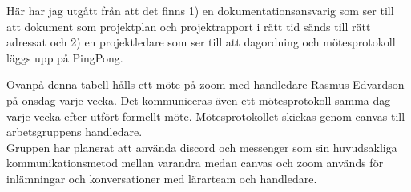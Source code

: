 \documentclass[a4paper]{article}
\begin{document}
Här har jag utgått från att det finns 1) en dokumentationsansvarig som
ser till att dokument som projektplan och projektrapport i rätt tid
sänds till rätt adressat och 2) en projektledare som ser till att
dagordning och mötesprotokoll läggs upp på PingPong.
\fi
{
\begin{table}[ht]
    \centering
    \caption{Kommunikationsplan för projektet}
    \label{tab:kommunikationsplan}
\end{table}
}
Ovanpå denna tabell hålls ett möte på zoom med handledare Rasmus Edvardson på onsdag varje vecka. Det kommuniceras även ett mötesprotokoll samma dag varje vecka efter utfört formellt möte. Mötesprotokollet skickas genom canvas till arbetsgruppens handledare.\\

Gruppen har planerat att använda discord och messenger som sin huvudsakliga kommunikationsmetod mellan varandra medan canvas och zoom används för inlämningar och konversationer med lärarteam och handledare. 
\end{document}
